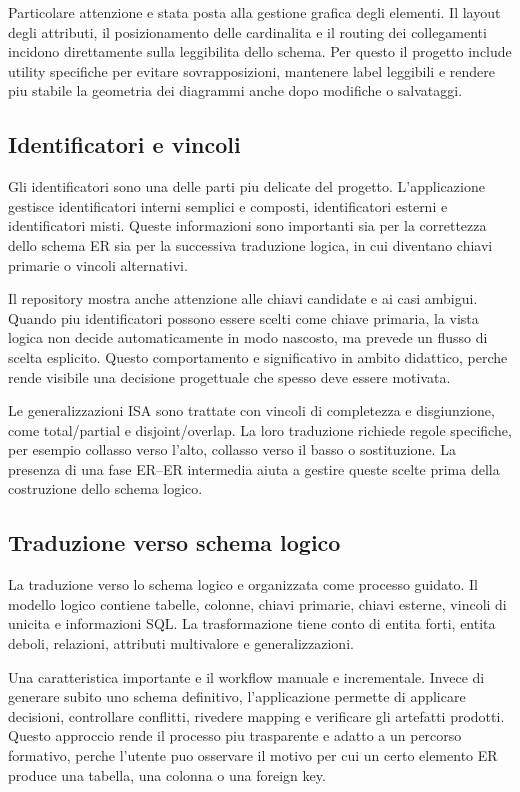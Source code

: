 Particolare attenzione e stata posta alla gestione grafica degli elementi. Il layout degli attributi, il posizionamento delle cardinalita e il routing dei collegamenti incidono direttamente sulla leggibilita dello schema. Per questo il progetto include utility specifiche per evitare sovrapposizioni, mantenere label leggibili e rendere piu stabile la geometria dei diagrammi anche dopo modifiche o salvataggi.

\subsection{Identificatori e vincoli}

Gli identificatori sono una delle parti piu delicate del progetto. L'applicazione gestisce identificatori interni semplici e composti, identificatori esterni e identificatori misti. Queste informazioni sono importanti sia per la correttezza dello schema ER sia per la successiva traduzione logica, in cui diventano chiavi primarie o vincoli alternativi.

Il repository mostra anche attenzione alle chiavi candidate e ai casi ambigui. Quando piu identificatori possono essere scelti come chiave primaria, la vista logica non decide automaticamente in modo nascosto, ma prevede un flusso di scelta esplicito. Questo comportamento e significativo in ambito didattico, perche rende visibile una decisione progettuale che spesso deve essere motivata.

Le generalizzazioni ISA sono trattate con vincoli di completezza e disgiunzione, come total/partial e disjoint/overlap. La loro traduzione richiede regole specifiche, per esempio collasso verso l'alto, collasso verso il basso o sostituzione. La presenza di una fase ER--ER intermedia aiuta a gestire queste scelte prima della costruzione dello schema logico.

\subsection{Traduzione verso schema logico}

La traduzione verso lo schema logico e organizzata come processo guidato. Il modello logico contiene tabelle, colonne, chiavi primarie, chiavi esterne, vincoli di unicita e informazioni SQL. La trasformazione tiene conto di entita forti, entita deboli, relazioni, attributi multivalore e generalizzazioni.

Una caratteristica importante e il workflow manuale e incrementale. Invece di generare subito uno schema definitivo, l'applicazione permette di applicare decisioni, controllare conflitti, rivedere mapping e verificare gli artefatti prodotti. Questo approccio rende il processo piu trasparente e adatto a un percorso formativo, perche l'utente puo osservare il motivo per cui un certo elemento ER produce una tabella, una colonna o una foreign key.

